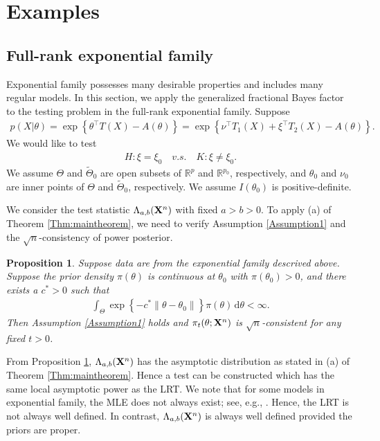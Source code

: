 \documentclass[11pt]{article}
\theoremstyle{plain}
\newtheorem{proposition}{\quad\quad Proposition}
\theoremstyle{definition}
\theoremstyle{remark}
\begin{document}
    \section{Examples}

\subsection{Full-rank exponential family}
Exponential family possesses many desirable properties and includes many regular models.
In this section, we apply the generalized fractional Bayes factor to the testing problem in the full-rank exponential family.
Suppose 
\begin{align*}
    p(X|\theta)
    =\exp \left\{ \theta^\top  T(X)-A(\theta) \right\}
    =\exp \left\{ \nu^\top  T_1(X) + \xi^\top T_2 (X) -A(\theta) \right\}
    .
\end{align*}
We would like to test
\begin{align*}
    H:\xi= \xi_0 \quad v.s.\quad K: \xi\neq \xi_0. 
\end{align*}
We assume $\Theta$ and $\tilde{\Theta}_0$ are open subsets of $\mathbb{R}^p$ and $\mathbb R^{p_0}$, respectively,
and $\theta_0$ and $\nu_0$ are inner points of $\Theta$ and $\tilde{\Theta}_0$, respectively.
We assume $I(\theta_0)$ is positive-definite.

We consider the test statistic $\Lambda_{a,b}(\mathbf{X}^n)$ with fixed $a>b> 0$.
To apply (a) of Theorem \ref{Thm:maintheorem},
we need to verify Assumption \ref{Assumption1} and the $\sqrt n$-consistency of power posterior.
\begin{proposition}\label{exponentialCon}
    Suppose data are from the exponential family descrived above.
    Suppose the prior density $\pi(\theta)$ is continuous at $\theta_0$ with $\pi(\theta_0) > 0$, and there exists a $c^* > 0$ such that
    \begin{align*}
        \int_{\Theta} 
        \exp\left\{- c^* \|\theta-\theta_0\|  \right\}
        \pi(\theta)\, \mathrm d\theta
        < \infty
        .
    \end{align*}
    Then Assumption \ref{Assumption1} holds and $\pi_{t}(\theta ;\mathbf{X}^{n})$ is $\sqrt n$-consistent for any fixed $t>0$.
\end{proposition}
From Proposition \ref{exponentialCon}, $\Lambda_{a,b}(\mathbf{X}^n)$ has the asymptotic distribution as stated in (a) of Theorem \ref{Thm:maintheorem}.
Hence a test can be constructed which has the same local asymptotic power as the LRT.
We note that for some models in exponential family, the MLE does not always exist; see, e.g., \cite{Rinaldo2013}.
Hence, the LRT is not always well defined.
In contrast, $\Lambda_{a,b}(\mathbf{X}^n)$ is always well defined provided the priors are proper.
\end{document}
